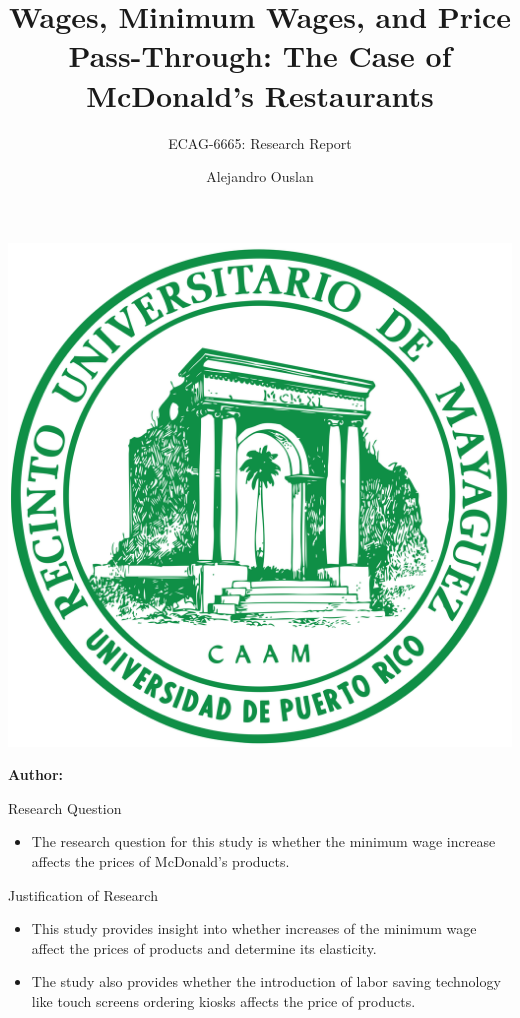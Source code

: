 \documentclass[12pt]{beamer}
\title[]{Wages, Minimum Wages, and Price Pass-Through:
	The Case of McDonald’s Restaurants}
\subtitle{ECAG-6665: Research Report}
\author[Name Surname]{Alejandro Ouslan}
\institute[institute]{University of Puerto Rico}
\date{} %
\begin{document}
\begin{frame}{}
	\vspace{\fill}

	\includegraphics[width=0.16\linewidth]{../../assets/uprm_logo.png}

	\vspace{\fill}

	\Large
	\color{main}
	\inserttitle

	\medskip

	\large
	\color{black}
	\insertsubtitle

	\vspace{\fill}

	\footnotesize
	\insertinstitute

	\vspace{\fill}

	\textbf{Author:} \insertauthor

	\medskip

	\insertdate

	\vspace{\fill}
\end{frame}

\begin{frame}[allowframebreaks]{Research Question}
	\begin{itemize}
		\item The research question for this study is whether the minimum wage increase affects the prices of McDonald's products. \cite{ashenfelter2022minimum}
	\end{itemize}

\end{frame}

\begin{frame}[allowframebreaks]{Justification of Research}
	\begin{itemize}
		\item This study provides insight into whether increases of the minimum wage affect the prices of products and determine its elasticity.
		\item The study also provides whether the introduction of labor saving technology like touch screens ordering kiosks affects the price of products.
	\end{itemize}

\end{frame}
\end{document}
